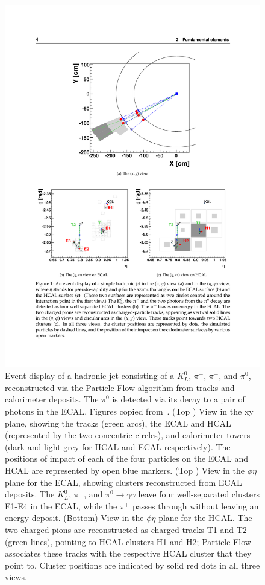 \begin{figure}[hbtp]
\begin{center}
    \includegraphics[width=1.0\cmsFigWidth]{figures/cms-pflow-c}
    \caption{Event display of a hadronic jet consisting of a $K^{0}_{L}$, $\pi^{+}$, $\pi^{-}$, and $\pi^{0}$, reconstructed via the Particle Flow algorithm from tracks and calorimeter deposits. The $\pi^{0}$ is detected via its decay to a pair of photons in the ECAL. Figures copied from~\cite{CMS-PAS-PFT-09-001}. (Top \cmsLeft) View in the xy plane, showing the tracks (green arcs), the ECAL and HCAL (represented by the two concentric circles), and calorimeter towers (dark and light grey for HCAL and ECAL respectively). The positions of impact of each of the four particles on the ECAL and HCAL are represented by open blue markers. (Top \cmsRight) View in the $\phi\eta$ plane for the ECAL, showing clusters reconstructed from ECAL deposits. The $K^{0}_{L}$, $\pi^{-}$, and $\pi^{0}\rightarrow\gamma\gamma$ leave four well-separated clusters E1-E4 in the ECAL, while the $\pi^{+}$ passes through without leaving an energy deposit. (Bottom) View in the $\phi\eta$ plane for the HCAL. The two charged pions are reconstructed as charged tracks T1 and T2 (green lines), pointing to HCAL clusters H1 and H2; Particle Flow associates these tracks with the respective HCAL cluster that they point to. Cluster positions are indicated by solid red dots in all three views.}
    \label{fig:cms-pflow}
  \end{center}
\end{figure}

